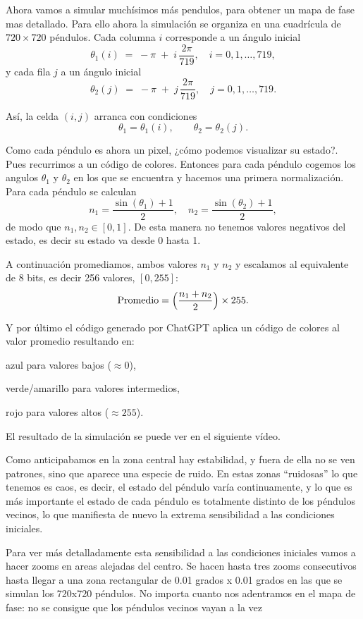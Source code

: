\documentclass[
  11pt,
  a4paper,
  DIV=11,
  numbers=noendperiod]{scrreprt}
\begin{document}
Ahora vamos a simular muchísimos más pendulos, para obtener un mapa de
fase mas detallado. Para ello ahora la simulación se organiza en una
cuadrícula de \(720 \times 720\) péndulos. Cada columna \(i\)
corresponde a un ángulo inicial \[
\theta_1(i) \;=\; -\pi \;+\; i\,\frac{2\pi}{719}, 
\quad i = 0,1,\dots,719,
\] y cada fila \(j\) a un ángulo inicial \[
\theta_2(j) \;=\; -\pi \;+\; j\,\frac{2\pi}{719}, 
\quad j = 0,1,\dots,719.
\]

Así, la celda \((i,j)\) arranca con condiciones \[
\theta_1 = \theta_1(i), 
\qquad
\theta_2 = \theta_2(j).
\]

Como cada péndulo es ahora un pixel, ¿cómo podemos visualizar su
estado?. Pues recurrimos a un código de colores. Entonces para cada
péndulo cogemos los angulos \(\theta_1\) y \(\theta_2\) en los que se
encuentra y hacemos una primera normalización. Para cada péndulo se
calculan \[
     n_1 = \frac{\sin(\theta_1) + 1}{2},
     \quad
     n_2 = \frac{\sin(\theta_2) + 1}{2},
   \] de modo que \(n_1,n_2 \in [0,1]\). De esta manera no tenemos
valores negativos del estado, es decir su estado va desde 0 hasta 1.

A continuación promediamos, ambos valores \(n_1\) y \(n_2\) y escalamos
al equivalente de 8 bits, es decir 256 valores, \([0,255]\): \[
     \text{Promedio} = \Bigl(\frac{n_1 + n_2}{2}\Bigr)\times 255.
   \]

Y por último el código generado por ChatGPT aplica un código de colores
al valor promedio resultando en:

azul para valores bajos (\(\approx 0\)),

verde/amarillo para valores intermedios,

rojo para valores altos (\(\approx 255\)).

El resultado de la simulación se puede ver en el siguiente vídeo.

Como anticipabamos en la zona central hay estabilidad, y fuera de ella
no se ven patrones, sino que aparece una especie de ruido. En estas
zonas ``ruidosas'' lo que tenemos es caos, es decir, el estado del
péndulo varía continuamente, y lo que es más importante el estado de
cada péndulo es totalmente distinto de los péndulos vecinos, lo que
manifiesta de nuevo la extrema sensibilidad a las condiciones iniciales.

Para ver más detalladamente esta sensibilidad a las condiciones
iniciales vamos a hacer zooms en areas alejadas del centro. Se hacen
hasta tres zooms consecutivos hasta llegar a una zona rectangular de
0.01 grados x 0.01 grados en las que se simulan los 720x720 péndulos. No
importa cuanto nos adentramos en el mapa de fase: no se consigue que los
péndulos vecinos vayan a la vez
\end{document}
